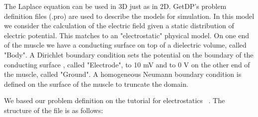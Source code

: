 \documentclass[preprint,journal]{vgtc}       %
\begin{document}
The Laplace equation can be used in 3D just as in 2D. 
GetDP's problem definition files (.pro) are used to describe the models for simulation. 
In this model we consider the calculation of the electric field given a static distribution of electric potential. 
This matches to an "electrostatic" physical model. 
On one end of the muscle we have a conducting surface on top of a dielectric volume, called "Body".
A Dirichlet boundary condition sets the potential on the boundary of the conducting surface , called "Electrode", to 10 mV and to 0 V on the other end of the muscle, called "Ground".
A homogeneous Neumann boundary condition is defined on the surface of the muscle to truncate the domain.

We based our problem definition on the tutorial for electrostatics ~\cite{Geuzaine2009}.
The structure of the file is as follows:
\end{document}
